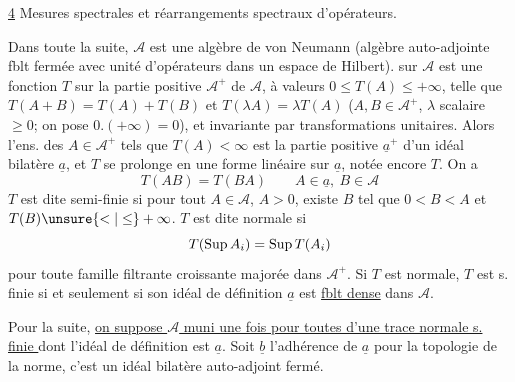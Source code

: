 \uline{4} Mesures spectrales et réarrangements spectraux d'opérateurs.

Dans toute la suite, $\mathcal A$ est une algèbre de von Neumann (algèbre auto-adjointe fblt fermée  avec unité d'opérateurs dans un espace de Hilbert).   sur $\mathcal A$ est une  fonction $T$ sur la partie positive $\mathcal A^+$ de $\mathcal A$, à valeurs $0\leq T(A)\leq+\infty$,  telle que $T(A+B)=T(A)+T(B)$ et $T(\lambda A)=\lambda T(A)$ ($A,B\in\mathcal A^+$, $\lambda$  scalaire $\geq0$; on pose $0.(+\infty)=0$), et invariante par transformations unitaires. Alors l'ens. des $A\in\mathcal A^+$ tels que $T(A)<\infty$ est la partie positive $\underline a^+$ d'un idéal bilatère  $\underline a$,  et $T$ se prolonge en une forme linéaire sur $\underline a$, notée encore $T$. On a
\[
T(AB)=T(BA)\qquad A\in\underline a,\ B\in\mathcal A
\]
$T$ est dite  semi-finie si pour tout  $A\in\mathcal A$, $A>0$, existe $B$ tel que $0<B<A$ et $T(B)\unsure{<|\leq}+\infty$. $T$ est dite normale si
\[
T(\mathop{\rm Sup} A_i)=\mathop{\rm Sup} T(A_i)
\]
pour toute famille filtrante croissante majorée  dans $\mathcal A^+$. Si $T$ est normale, $T$ est  s. finie si et seulement si  son idéal de définition $\underline a$ est \uline{fblt dense} dans $\mathcal A$.


Pour la suite, \uline{on suppose $\mathcal A$ muni une fois pour toutes d'une trace normale s. finie  } dont l'idéal de définition est $\underline a$. Soit $\underline b$ l'adhérence de $\underline a$ pour la topologie de la norme, c'est un idéal bilatère auto-adjoint  fermé.
